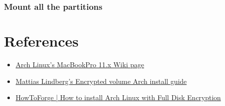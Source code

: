 \begin{itemize-steps}
	\item {}
	\item {}
	\item {}
	\item {}
	\item {}
\end{itemize-steps}

\subsubsection{Mount all the partitions}

\begin{itemize-steps}
	\item {}
	\item {}
	\item {}
	\item {}
	\item {}
	\item {}
	\item {}
	\item {}
\end{itemize-steps}







\clearpage
\section{References}

\begin{itemize}
	\item \href{https://wiki.archlinux.org/index.php/MacBookPro11,x#Using_the_MacBook.27s_native_EFI_bootloader_.28recommended.29}{Arch Linux's MacBookPro 11.x Wiki page}
	\item \href{https://gist.github.com/mattiaslundberg/8620837}{Mattias Lindberg's Encrypted volume Arch install guide}
	\item \href{https://www.howtoforge.com/tutorial/how-to-install-arch-linux-with-full-disk-encryption/}{HowToForge | How to install Arch Linux with Full Disk Encryption}
\end{itemize}

